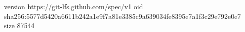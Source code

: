 version https://git-lfs.github.com/spec/v1
oid sha256:5577d5420a6611b242a1e9f7a81e3385c9a639034fe8395e7a1f3c29e792e0e7
size 87544
